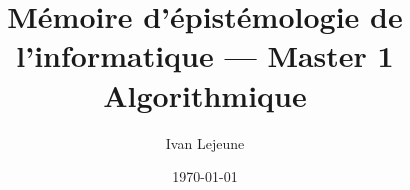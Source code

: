 




\usepackage[a4paper,hmargin=30mm,vmargin=30mm]{geometry}



\title{\color{astral} \sffamily \bfseries Mémoire d'épistémologie de l'informatique --- Master 1 Algorithmique}
\author{Ivan Lejeune}
\date{\today}



    

    \newpage
    \tableofcontents

    \newpage
    

    \newpage
    

    \newpage
    

    \newpage
    

    \newpage
    

    \newpage
    

    \newpage
    

    \newpage
    

    \newpage
    







